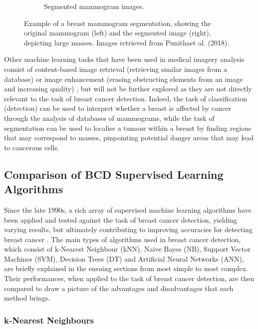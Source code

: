 \begin{figure}[h]
\begin{subfigure}{.5\textwidth}
  \caption{Segmented mammogram images.}
  \label{fig:segmented-mammogram}
\end{subfigure}
\caption{\label{fig:segmentation_example}Example of a breast mammogram segmentation, showing the original mammogram (left) and the segmented image (right), depicting large masses. Images retrieved from Punithaet al. (2018).}
\end{figure}

Other machine learning tasks that have been used in medical imagery analysis consist of content-based image retrieval (retrieving similar images from a database) or image enhancement (erasing obstructing elements from an image and increasing quality) \citep{Litjens2017}, but will not be further explored as they are not directly relevant to the task of breast cancer detection. Indeed, the task of classification (detection) can be used to interpret whether a breast is affected by cancer through the analysis of databases of mammograms, while the task of segmentation can be used to localise a tumour within a breast by finding regions that may correspond to masses, pinpointing potential danger areas that may lead to cancerous cells.

\subsection{Comparison of BCD Supervised Learning Algorithms}

Since the late 1990s, a rich array of supervised machine learning algorithms have been applied and tested against the task of breast cancer detection, yielding varying results, but ultimately contributing to improving accuracies for detecting breast cancer \citep{Yue2018}. The main types of algorithms used in breast cancer detection, which consist of k-Nearest Neighbour (kNN), Naive Bayes (NB), Support Vector Machines (SVM), Decision Trees (DT) and Artificial Neural Networks (ANN), are briefly explained in the ensuing sections from most simple to most complex. Their performances, when applied to the task of breast cancer detection, are then compared to draw a picture of the advantages and disadvantages that each method brings.

\subsubsection{k-Nearest Neighbours}
\label{sec:litreview-knn}

